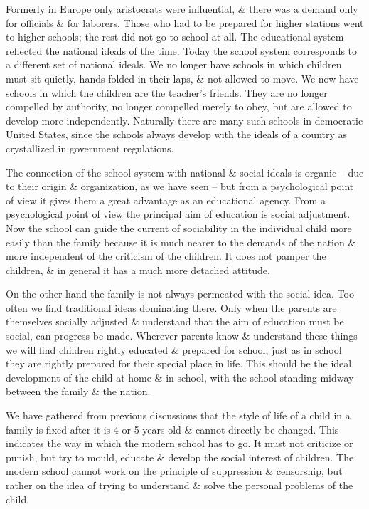 \documentclass{article}
\begin{document}
Formerly in Europe only aristocrats were influential, \& there was a demand only for officials \& for laborers. Those who had to be prepared for higher stations went to higher schools; the rest did not go to school at all. The educational system reflected the national ideals of the time. Today the school system corresponds to a different set of national ideals. We no longer have schools in which children must sit quietly, hands folded in their laps, \& not allowed to move. We now have schools in which the children are the teacher's friends. They are no longer compelled by authority, no longer compelled merely to obey, but are allowed to develop more independently. Naturally there are many such schools in democratic United States, since the schools always develop with the ideals of a country as crystallized in government regulations.

The connection of the school system with national \& social ideals is organic -- due to their origin \& organization, as we have seen -- but from a psychological point of view it gives them a great advantage as an educational agency. From a psychological point of view the principal aim of education is social adjustment. Now the school can guide the current of sociability in the individual child more easily than the family because it is much nearer to the demands of the nation \& more independent of the criticism of the children. It does not pamper the children, \& in general it has a much more detached attitude.

On the other hand the family is not always permeated with the social idea. Too often we find traditional ideas dominating there. Only when the parents are themselves socially adjusted \& understand that the aim of education must be social, can progress be made. Wherever parents know \& understand these things we will find children rightly educated \& prepared for school, just as in school they are rightly prepared for their special place in life. This should be the ideal development of the child at home \& in school, with the school standing midway between the family \& the nation.

We have gathered from previous discussions that the style of life of a child in a family is fixed after it is 4 or 5 years old \& cannot directly be changed. This indicates the way in which the modern school has to go. It must not criticize or punish, but try to mould, educate \& develop the social interest of children. The modern school cannot work on the principle of suppression \& censorship, but rather on the idea of trying to understand \& solve the personal problems of the child.
\end{document}
